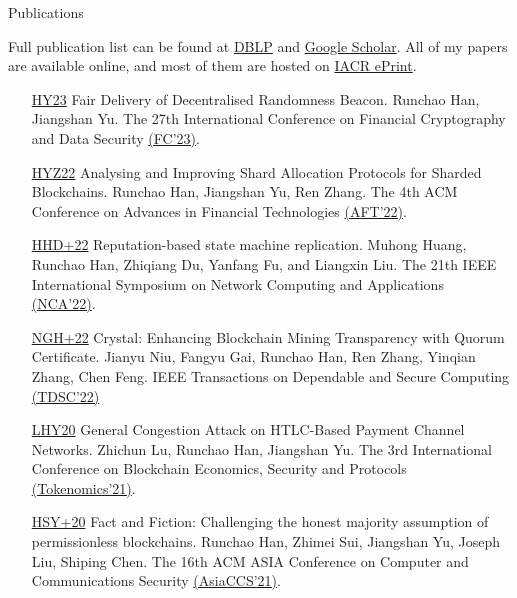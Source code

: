 \documentclass{resume} %
\begin{document}
\begin{rSection}{Publications}

    Full publication list can be found at \href{https://dblp.org/pers/hd/h/Han:Runchao}{DBLP} and \href{http://scholar.google.com/citations?user=xbpDocQAAAAJ&hl=en}{Google Scholar}.
    All of my papers are available online, and most of them are hosted on \href{https://eprint.iacr.org/}{IACR ePrint}.

    \begin{itemize}
        \item[\href{https://eprint.iacr.org/2023/103}{HY23}] Fair Delivery of Decentralised Randomness Beacon. Runchao Han, Jiangshan Yu. The 27th International Conference on Financial Cryptography and Data Security \href{https://fc23.ifca.ai/}{(FC'23)}.
        \item[\href{https://eprint.iacr.org/2020/943}{HYZ22}] Analysing and Improving Shard Allocation Protocols for Sharded Blockchains. Runchao Han, Jiangshan Yu, Ren Zhang. The 4th ACM Conference on Advances in Financial Technologies \href{https://aft.acm.org/aft22/index.html}{(AFT'22)}.
        \item[\href{https://eprint.iacr.org/2023/169}{HHD+22}] Reputation-based state machine replication. Muhong Huang, Runchao Han, Zhiqiang Du, Yanfang Fu, and Liangxin Liu. The 21th IEEE International Symposium on Network Computing and Applications \href{https://www.nca-ieee.org/2022/index.html}{(NCA'22)}.
        \item[\href{https://ieeexplore.ieee.org/document/9927474/}{NGH+22}] Crystal: Enhancing Blockchain Mining Transparency with Quorum Certificate. Jianyu Niu, Fangyu Gai, Runchao Han, Ren Zhang, Yinqian Zhang, Chen Feng. IEEE Transactions on Dependable and Secure Computing \href{https://ieeexplore.ieee.org/xpl/RecentIssue.jsp?punumber=8858}{(TDSC'22)}
        \item[\href{https://eprint.iacr.org/2020/456.pdf}{LHY20}] General Congestion Attack on HTLC-Based Payment Channel Networks. Zhichun Lu, Runchao Han, Jiangshan Yu. The 3rd International Conference on Blockchain Economics, Security and Protocols \href{https://drops.dagstuhl.de/opus/volltexte/2022/15899/}{(Tokenomics'21)}.
        \item[\href{https://eprint.iacr.org/2019/752}{HSY+20}] Fact and Fiction: Challenging the honest majority assumption of permissionless blockchains. Runchao Han, Zhimei Sui, Jiangshan Yu, Joseph Liu, Shiping Chen. The 16th ACM ASIA Conference on Computer and Communications Security \href{https://dl.acm.org/doi/10.1145/3433210.3453087}{(AsiaCCS'21)}.

\end{itemize}
\end{rSection}
\end{document}
